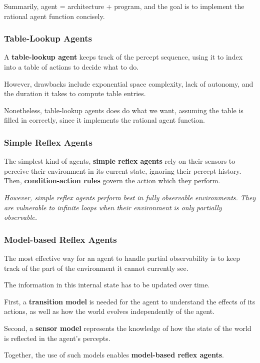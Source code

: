 Summarily, agent = architecture + program, and the goal is to implement the rational agent function concisely.


\subsubsection{Table-Lookup Agents}

A \textbf{table-lookup agent} keeps track of the percept sequence, using it to index into a table of actions to decide what to do.

However, drawbacks include exponential space complexity, lack of autonomy, and the duration it takes to compute table entries.

Nonetheless, table-lookup agents does do what we want, assuming the table is filled in correctly, since it implements the rational agent function.


\subsubsection{Simple Reflex Agents}

The simplest kind of agents, \textbf{simple reflex agents} rely on their sensors to perceive their environment in its current state, ignoring their percept history. Then, \textbf{condition-action rules} govern the action which they perform.

\emph{However, simple reflex agents perform best in fully observable environments. They are vulnerable to infinite loops when their environment is only partially observable.}


\subsubsection{Model-based Reflex Agents}

The most effective way for an agent to handle partial observability is to keep track of the part of the environment it cannot currently see.

The information in this internal state has to be updated over time.

First, a \textbf{transition model} is needed for the agent to understand the effects of its actions, as well as how the world evolves independently of the agent.

Second, a \textbf{sensor model} represents the knowledge of how the state of the world is reflected in the agent's percepts.

Together, the use of such models enables \textbf{model-based reflex agents}.


